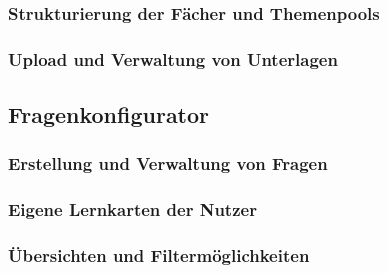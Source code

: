 \subsubsection{Strukturierung der Fächer und Themenpools}
\subsubsection{Upload und Verwaltung von Unterlagen}

\subsection{Fragenkonfigurator}
\subsubsection{Erstellung und Verwaltung von Fragen}
\subsubsection{Eigene Lernkarten der Nutzer}
\subsubsection{Übersichten und Filtermöglichkeiten}